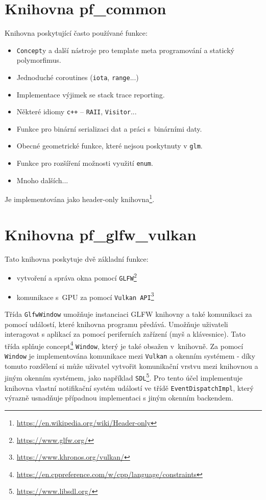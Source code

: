 \section{Knihovna pf\_common}
Knihovna poskytující často používané funkce:
\begin{itemize}
	\item \texttt{Concept}y a další nástroje pro template meta programování a statický polymorfimus.
	\item Jednoduché coroutines (\texttt{iota}, \texttt{range}...)
	\item Implementace výjimek se stack trace reporting.
	\item Některé idiomy \texttt{c++} -- \texttt{RAII}, \texttt{Visitor}...
	\item Funkce pro binární serializaci dat a práci s~binárními daty.
	\item Obecné geometrické funkce, které nejsou poskytnuty v \texttt{glm}.
	\item Funkce pro rozšíření možnosti využití \texttt{enum}.
	\item Mnoho dalších...
\end{itemize}

Je implementována jako header-only knihovna\footnote{\url{https://en.wikipedia.org/wiki/Header-only}}.

\section{Knihovna pf\_glfw\_vulkan}
Tato knihovna poskytuje dvě základní funkce:
\begin{itemize}
	\item vytvoření a správa okna pomocí \texttt{GLFW}\footnote{\url{https://www.glfw.org/}}
	\item komunikace s~GPU za pomocí \texttt{Vulkan API}\footnote{\url{https://www.khronos.org/vulkan/}}
\end{itemize}

Třída \texttt{GlfwWindow} umožňuje instanciaci GLFW knihovny a také komunikaci za pomocí událostí, které knihovna programu předává. Umožňuje uživateli interagovat s aplikací za pomocí periferních zařízení (myš a klávesnice). Tato třída splňuje concept\footnote{\url{https://en.cppreference.com/w/cpp/language/constraints}} \texttt{Window}, který je také obsažen v~knihovně. Za pomocí \texttt{Window} je implementována komunikace mezi \texttt{Vulkan} a okenním systémem - díky tomuto rozdělení si může uživatel vytvořit komunikační vrstvu mezi knihovnou a jiným okenním systémem, jako například \texttt{SDL}\footnote{\url{https://www.libsdl.org/}}. Pro tento účel implementuje knihovna vlastní notifikační systém událostí ve třídě \texttt{EventDispatchImpl}, který výrazně usnadňuje případnou implementaci s jiným okenním backendem.

